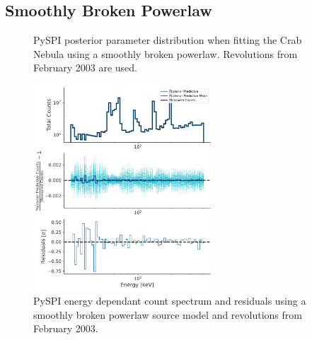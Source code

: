 \documentclass{report}
\begin{document}
\FloatBarrier

\subsection{Smoothly Broken Powerlaw}
\begin{figure}[H]
  \centering
  \caption{PySPI posterior parameter distribution when fitting the Crab Nebula using a smoothly broken powerlaw. Revolutions from February 2003 are used.}
  \label{fig sm br pl fit param}
\end{figure}

\begin{figure}[h]
  \centering
  \includegraphics[width=0.6\textwidth]{Images/Crab_Fits/energy_residual_plot_sm_br_pl.pdf}
  \caption{PySPI energy dependant count spectrum and residuals using a smoothly broken powerlaw source model and revolutions from February 2003.}
  \label{fig res sm br pl}
\end{figure}
\end{document}
